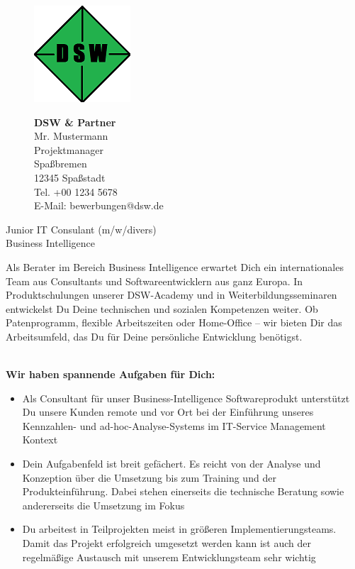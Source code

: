 \documentclass[12pt,utf8]{scrartcl}
\begin{document}
\begin{flushleft}
\newpage
\begin{figure}[htbp]
	\begin{minipage}[t]{4cm}
		\vspace{0pt}
		\centering
		\includegraphics{images/Logo}
		\label{fig:Logo}
	\end{minipage}
	\hfill
	\begin{minipage}[t]{4cm}
		\vspace{0pt}
		\scriptsize
		\textbf{DSW \& Partner}\\
		Mr. Mustermann\\
		Projektmanager\\
		Spaßbremen\\
		12345 Spaßstadt\\
		Tel. +00 1234 5678 \\
		E-Mail: bewerbungen@dsw.de
	\end{minipage}
\end{figure}
			
\large
\begin{center}Junior IT Consulant (m/w/divers) \\Business Intelligence\end{center}

\scriptsize
Als Berater im Bereich Business Intelligence erwartet Dich ein internationales Team aus Consultants und Softwareentwicklern aus ganz Europa. In Produktschulungen unserer DSW-Academy und in Weiterbildungsseminaren entwickelst Du Deine technischen und sozialen Kompetenzen weiter. Ob Patenprogramm, flexible Arbeitszeiten oder Home-Office – wir bieten Dir das Arbeitsumfeld, das Du für Deine persönliche Entwicklung benötigst.


\textbf{\\Wir haben spannende Aufgaben für Dich:}
\begin{center}
	\begin{itemize}
		\item Als Consultant für unser Business-Intelligence Softwareprodukt unterstützt Du unsere Kunden remote und vor Ort bei der Einführung unseres Kennzahlen- und ad-hoc-Analyse-Systems im IT-Service Management Kontext
		\item Dein Aufgabenfeld ist breit gefächert. Es reicht von der Analyse und Konzeption über die Umsetzung bis zum Training und der Produkteinführung. Dabei stehen einerseits die technische Beratung sowie andererseits die Umsetzung im Fokus
		\item Du arbeitest in Teilprojekten meist in größeren Implementierungsteams. Damit das Projekt erfolgreich umgesetzt werden kann ist auch der regelmäßige Austausch mit unserem Entwicklungsteam sehr wichtig
	\end{itemize}
\end{center}


\end{flushleft}
\end{document}
